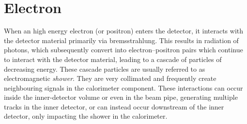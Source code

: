 \large
\section{Electron}
\label{sec:electron}
When an high energy electron (or positron) enters the detector, 
it interacts with the detector material primarily via bremsstrahlung. 
This results in radiation of photons, which subsequently convert into 
electron–positron pairs which continue to 
interact with the detector material, 
leading to a cascade of particles of decreasing energy.
These cascade particles are usually referred to as electromagnetic \textit{shower}.
They are very collimated and frequently create neighbouring signals in the calorimeter component. 
These interactions can occur inside the inner-detector volume 
or even in the beam pipe, generating multiple tracks
in the inner detector, or can instead occur downstream 
of the inner detector, only impacting the shower in
the calorimeter. 
